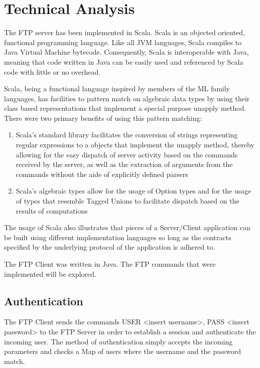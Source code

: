 \chapter{Technical Analysis}
The FTP server has been implemented in Scala. Scala is an objected oriented, functional programming language. Like all JVM languages,
Scala compiles to Java Virtual Machine bytecode. Consequently, Scala is interoperable with Java, meaning that code written in Java can be easily used
and referenced by Scala code with little or no overhead.

Scala, being a functional language inspired by members of the ML family languages, has facilities to pattern match on algebraic data types by using their
class based representations that implement a special purpose unapply method. There were two primary benefits of using this pattern matching:

\begin{enumerate}

	\item Scala's standard library facilitates the conversion of strings representing regular expressions to a objects that implement the unapply method,
	thereby allowing for the easy dispatch of server activity based on the commands received by the server, as well as the extraction of arguments from the commands without
	the aide of explicitly defined parsers

	\item Scala's algebraic types allow for the usage of Option types and for the usage of types that resemble Tagged Unions to facilitate dispatch based on the results of computations

\end{enumerate}


The usage of Scala also illustrates that pieces of a Server/Client application can be built using different implementation languages so long as the contracts
specified by the underlying protocol of the application is adhered to.

The FTP Client was written in Java. The FTP commands that were implemented will be explored.

\section{Authentication}

The FTP Client sends the commands USER <insert username>, PASS <insert password> to the FTP Server
in order to establish a session and authenticate the incoming user. The method of authentication simply
accepts the incoming parameters and checks a Map of users where the username and the password match.\par

